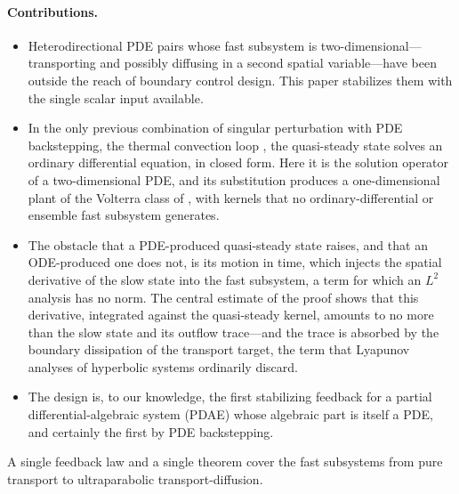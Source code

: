 \documentclass[12pt]{article}
\theoremstyle{plain}
\theoremstyle{remark}
\begin{document}
\paragraph{Contributions.}
\begin{itemize}
\item Heterodirectional PDE pairs whose fast subsystem is two-dimensional---transporting and possibly diffusing in a second spatial variable---have been outside the reach of boundary control design. This paper stabilizes them with the single scalar input available.
\item In the only previous combination of singular perturbation with PDE backstepping, the thermal convection loop \cite{VazquezKrstic2006}, the quasi-steady state solves an ordinary differential equation, in closed form. Here it is the solution operator of a two-dimensional PDE, and its substitution produces a one-dimensional plant of the Volterra class of \cite{KrsticSmyshlyaev2008}, with kernels that no ordinary-differential or ensemble fast subsystem generates.
\item The obstacle that a PDE-produced quasi-steady state raises, and that an ODE-produced one does not, is its motion in time, which injects the spatial derivative of the slow state into the fast subsystem, a term for which an $L^2$ analysis has no norm. The central estimate of the proof shows that this derivative, integrated against the quasi-steady kernel, amounts to no more than the slow state and its outflow trace---and the trace is absorbed by the boundary dissipation of the transport target, the term that Lyapunov analyses of hyperbolic systems ordinarily discard.
\item The design is, to our knowledge, the first stabilizing feedback for a partial differential-algebraic system (PDAE) whose algebraic part is itself a PDE, and certainly the first by PDE backstepping.
\end{itemize}
A single feedback law and a single theorem cover the fast subsystems from pure transport to ultraparabolic transport-diffusion.
\end{document}
